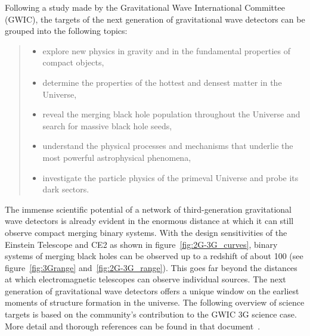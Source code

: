 \documentclass[graybox, nosecnum]{svmult}
\begin{document}
Following a study \cite{GWIC-SC} made by the Gravitational Wave International Committee (GWIC), the targets of the next generation of gravitational wave detectors can be grouped into the following topics:
\begin{quotation}

\begin{itemize}
\item explore new physics in gravity and in the fundamental properties of compact objects,
\item determine the properties of the hottest and densest matter in the Universe,
\item reveal the merging black hole population throughout the Universe and search for massive black
hole seeds,
\item understand the physical processes and mechanisms that underlie the most powerful astrophysical
phenomena,
\item investigate the particle physics of the primeval Universe and probe its dark sectors.
\end{itemize}

\end{quotation}

The immense scientific potential of a network of third-generation gravitational wave detectors is already evident in the enormous distance at which it can still observe compact merging binary systems. With the design sensitivities of the Einstein Telescope and CE2 as shown in figure~\ref{fig:2G-3G_curves}, binary systems of merging black holes can be observed up to a redshift of about 100 (see figure~\ref{fig:3Grange} and~\ref{fig:2G-3G_range}). This goes far beyond the distances at which electromagnetic telescopes can observe individual sources. The next generation of gravitational wave detectors offers a unique window on the earliest moments of structure formation in the universe. The following overview of science targets is based on the community's contribution to the GWIC 3G science case. More detail and thorough references can be found in that document~\cite{GWIC-SC}.   
\end{document}
